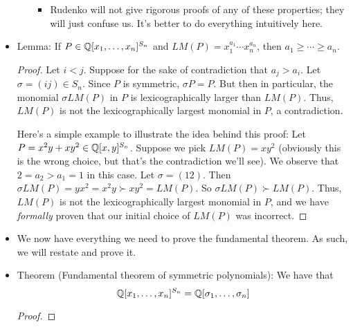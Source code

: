 \documentclass[../notes.tex]{subfiles}
\begin{document}
\begin{itemize}
\begin{enumerate}
\begin{itemize}
            \item Rudenko will not give rigorous proofs of any of these properties; they will just confuse us. It's better to do everything intuitively here.
        \end{itemize}
    \end{enumerate}
    \item Lemma: If $P\in\mathbb{Q}[x_1,\dots,x_n]^{S_n}$ and $LM(P)=x_1^{a_1}\cdots x_n^{a_n}$, then $a_1\geq\cdots\geq a_n$.
    \begin{proof}
        Let $i<j$. Suppose for the sake of contradiction that $a_j>a_i$. Let $\sigma=(ij)\in S_n$. Since $P$ is symmetric, $\sigma P=P$. But then in particular, the monomial $\sigma LM(P)$ in $P$ is lexicographically larger than $LM(P)$. Thus, $LM(P)$ is not the lexicographically largest monomial in $P$, a contradiction.\par
        Here's a simple example to illustrate the idea behind this proof: Let $P=x^2y+xy^2\in\mathbb{Q}[x,y]^{S_n}$. Suppose we pick $LM(P)=xy^2$ (obviously this is the wrong choice, but that's the contradiction we'll see). We observe that $2=a_2>a_1=1$ in this case. Let $\sigma=(12)$. Then $\sigma LM(P)=yx^2=x^2y\succ xy^2=LM(P)$. So $\sigma LM(P)\succ LM(P)$. Thus, $LM(P)$ is not the lexicographically largest monomial in $P$, and we have \emph{formally} proven that our initial choice of $LM(P)$ was incorrect.
    \end{proof}
    \item We now have everything we need to prove the fundamental theorem. As such, we will restate and prove it.
    \item Theorem (Fundamental theorem of symmetric polynomials): We have that
    \begin{equation*}
        \mathbb{Q}[x_1,\dots,x_n]^{S_n} = \mathbb{Q}[\sigma_1,\dots,\sigma_n]
    \end{equation*}
    \begin{proof}


\end{proof}
\end{itemize}
\end{document}
